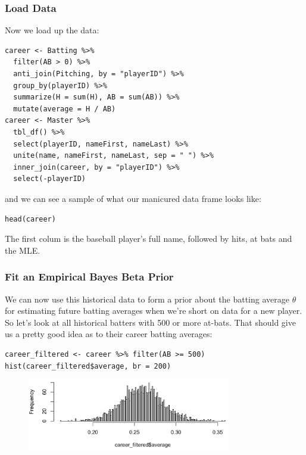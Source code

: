 \documentclass[slides]{beamer} %
\begin{document}
\begin{frame}[fragile]
	\frametitle{Load Data}
	
\scriptsize
Now we load up the data: \pause

\begin{verbatim}
career <- Batting %>%
  filter(AB > 0) %>%
  anti_join(Pitching, by = "playerID") %>%
  group_by(playerID) %>%
  summarize(H = sum(H), AB = sum(AB)) %>%
  mutate(average = H / AB)
career <- Master %>%
  tbl_df() %>%
  select(playerID, nameFirst, nameLast) %>%
  unite(name, nameFirst, nameLast, sep = " ") %>%
  inner_join(career, by = "playerID") %>%
  select(-playerID)
\end{verbatim}\pause 

and we can see a sample of what our manicured data frame looks like: \pause

\begin{verbatim}
head(career)
\end{verbatim}\pause 

The first colum is the baseball player's full name, followed by hits, at bats and the MLE.

\end{frame}

\begin{frame}[fragile]
	\frametitle{Fit an Empirical Bayes Beta Prior}

\scriptsize
We can now use this historical data to form a prior about the batting average $\theta$ for estimating future batting averages when we're short on data for a new player. \pause So let's look at all historical batters with 500 or more at-bats. \pause That should give us a pretty good idea as to their career batting averages:


\begin{verbatim}
career_filtered <- career %>% filter(AB >= 500)
hist(career_filtered$average, br = 200)
\end{verbatim}


\begin{figure}[htp]
\centering
\includegraphics[width=3.5in]{images/bas.png}
\end{figure}

\end{frame}
\end{document}
